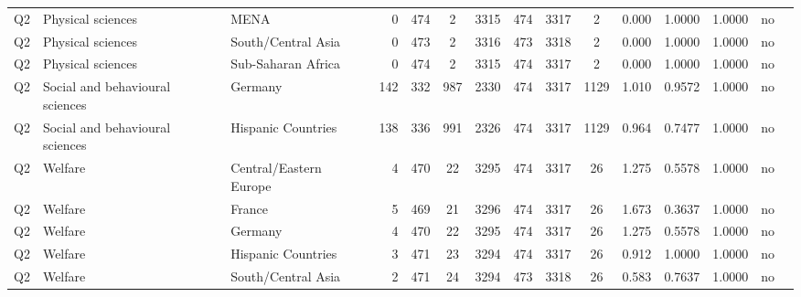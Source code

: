 \begin{longtable}{lllrcccccccccll}
Q2 & Physical sciences & MENA & 0 & 474 & 2 & 3315 & 474 & 3317 & 2 & 0.000 & 1.0000 & 1.0000 & no \\
Q2 & Physical sciences & South/Central Asia & 0 & 473 & 2 & 3316 & 473 & 3318 & 2 & 0.000 & 1.0000 & 1.0000 & no \\
Q2 & Physical sciences & Sub-Saharan Africa & 0 & 474 & 2 & 3315 & 474 & 3317 & 2 & 0.000 & 1.0000 & 1.0000 & no \\
Q2 & Social and behavioural sciences & Germany & 142 & 332 & 987 & 2330 & 474 & 3317 & 1129 & 1.010 & 0.9572 & 1.0000 & no \\
Q2 & Social and behavioural sciences & Hispanic Countries & 138 & 336 & 991 & 2326 & 474 & 3317 & 1129 & 0.964 & 0.7477 & 1.0000 & no \\
Q2 & Welfare & Central/Eastern Europe & 4 & 470 & 22 & 3295 & 474 & 3317 & 26 & 1.275 & 0.5578 & 1.0000 & no \\
Q2 & Welfare & France & 5 & 469 & 21 & 3296 & 474 & 3317 & 26 & 1.673 & 0.3637 & 1.0000 & no \\
Q2 & Welfare & Germany & 4 & 470 & 22 & 3295 & 474 & 3317 & 26 & 1.275 & 0.5578 & 1.0000 & no \\
Q2 & Welfare & Hispanic Countries & 3 & 471 & 23 & 3294 & 474 & 3317 & 26 & 0.912 & 1.0000 & 1.0000 & no \\
Q2 & Welfare & South/Central Asia & 2 & 471 & 24 & 3294 & 473 & 3318 & 26 & 0.583 & 0.7637 & 1.0000 & no \\
\end{longtable}
